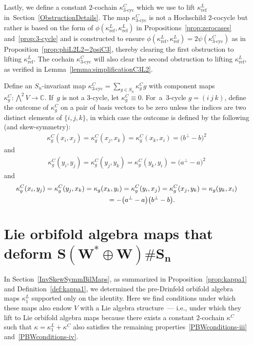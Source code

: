 \documentclass[pdftex]{sigma}
\numberwithin{equation}{section}
\DeclareMathOperator{\refl}{ref}
\DeclareMathOperator{\tri}{3-cyc}
\begin{document}
Lastly, we define a constant $2$-cochain $\kappa^C_{\tri}$ which we use to lift $\kappa^L_{\refl}$ in~Section~\ref{ObstructionDetails}. The map $\kappa^C_{\tri}$ is not a Hochschild $2$-cocycle but rather is
based on the form of $\phi(\kappa^L_{\refl},\kappa^L_{\refl})$ in Propositions~\ref{prop:zerocases} and~\ref{prop:3-cycle} and is constructed to ensure $\phi(\kappa^L_{\refl},\kappa^L_{\refl})=2\psi(\kappa^C_{\tri})$ as in
Proposition~\ref{prop:phiL2L2=2psiC3}, thereby
clearing the first obstruction to lifting $\kappa^L_{\refl}$. The cochain $\kappa^C_{\tri}$ will also clear the second obstruction to lifting $\kappa^L_{\refl}$, as verified in Lemma~\ref{lemma:simplificationC3L2}.

\begin{Definition}\label{def:kappatri}
Define an $S_n$-invariant map $\kappa^C_{\tri}=\sum_{g\in S_n}\kappa^C_gg$ with component maps $\kappa^C_{g}\colon \bigwedge^2 V\to \mathbb{C}$. If~$g$ is not a $3$-cycle, let $\kappa^C_g\equiv 0$. For~a~$3$-cycle $g=(i~j~k)$, define the outcome of $\kappa_{g}^C$ on a pair of basis vectors to be zero unless the indices are two distinct elements of $\{i,j,k\}$, in which case the outcome is defined by the following (and skew-symmetry):
\begin{gather*}
\kappa_{g}^C(x_i,x_j)=\kappa_{g}^C(x_j,x_k)=\kappa_{g}^C(x_k,x_i)=\big(b^{\perp}-b\big)^2
\end{gather*}
and
\begin{gather*}
\kappa_{g}^C(y_i,y_j)=\kappa_{g}^C(y_j,y_k)=\kappa_{g}^C(y_k,y_i)=\big(a^{\perp}-a\big)^2
\end{gather*}
and
\begin{gather*}
\kappa_{g}^C(x_i,y_j)=\kappa_{g}^C(y_j,x_k)=\kappa_{g}(x_k,y_i)
=\kappa_{g}^C(y_i,x_j)=\kappa_{g}^C(x_j,y_k)=\kappa_{g}(y_k,x_i)
\\ \hphantom{\kappa_{g}^C(x_i,y_j)}
{}=-\big(a^{\perp}-a\big)\big(b^{\perp}-b\big).
\end{gather*}
\end{Definition}

\section[Lie orbifold algebra maps that deform S(W* + W)Sn]
{Lie orbifold algebra maps that deform $\boldsymbol{S(W^* \oplus W)\# S_n}$}\label{InvLieBrackets}

In Section~\ref{InvSkewSymmBilMaps}, as summarized in Proposition~\ref{prop:kappa1} and Definition~\ref{def:kappa1},
we determined the
pre-Drinfeld orbifold algebra maps $\kappa^L_1$ supported only on the identity.
Here we find conditions under which these maps also endow
$V$ with a Lie algebra structure~--- i.e., under which they lift to Lie orbifold
algebra maps because there exists a constant $2$-cochain $\kappa^C$
such that $\kappa=\kappa^L_1+\kappa^C$ also satisfies the remaining
properties~\eqref{PBWconditions-iii} and~\eqref{PBWconditions-iv}.
\end{document}
